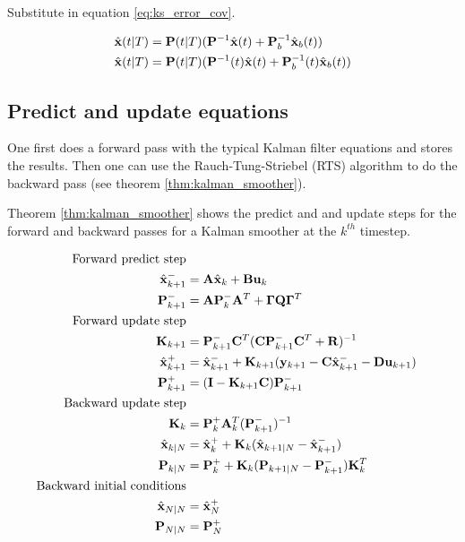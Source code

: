 Substitute in equation \eqref{eq:ks_error_cov}.

\begin{align}
  \hat{\mathbf{x}}(t|T) &= \mathbf{P}(t|T)
    (\mathbf{P}^{-1}\hat{\mathbf{x}}(t) + \mathbf{P}_b^{-1}\hat{\mathbf{x}}_b(t)) \nonumber
    \\
  \hat{\mathbf{x}}(t|T) &= \mathbf{P}(t|T)
    (\mathbf{P}^{-1}(t)\hat{\mathbf{x}}(t) + \mathbf{P}_b^{-1}(t)\hat{\mathbf{x}}_b(t))
\end{align}

\subsection{Predict and update equations}

One first does a forward pass with the typical Kalman filter equations and
stores the results. Then one can use the Rauch-Tung-Striebel (RTS) algorithm to
do the backward pass (see theorem \ref{thm:kalman_smoother}).

Theorem \ref{thm:kalman_smoother} shows the predict and and update steps for the
forward and backward passes for a Kalman smoother at the $k^{th}$ timestep.

\begin{theorem}
  \label{thm:kalman_smoother}

  \begin{align}
    \text{Forward predict step} \nonumber \\
    \hat{\mathbf{x}}_{k+1}^- &= \mathbf{A}\hat{\mathbf{x}}_k + \mathbf{B} \mathbf{u}_k \\
    \mathbf{P}_{k+1}^- &= \mathbf{A} \mathbf{P}_k^- \mathbf{A}^T +
      \mathbf{\Gamma}\mathbf{Q}\mathbf{\Gamma}^T \\
    \text{Forward update step} \nonumber \\
    \mathbf{K}_{k+1} &=
      \mathbf{P}_{k+1}^- \mathbf{C}^T (\mathbf{C}\mathbf{P}_{k+1}^- \mathbf{C}^T +
      \mathbf{R})^{-1} \\
    \hat{\mathbf{x}}_{k+1}^+ &=
      \hat{\mathbf{x}}_{k+1}^- + \mathbf{K}_{k+1}(\mathbf{y}_{k+1} -
      \mathbf{C} \hat{\mathbf{x}}_{k+1}^- - \mathbf{D}\mathbf{u}_{k+1}) \\
    \mathbf{P}_{k+1}^+ &= (\mathbf{I} - \mathbf{K}_{k+1}\mathbf{C})\mathbf{P}_{k+1}^- \\
    \text{Backward update step} \nonumber \\
    \mathbf{K}_k &= \mathbf{P}_k^+ \mathbf{A}_k^T (\mathbf{P}_{k+1}^-)^{-1} \\
    \hat{\mathbf{x}}_{k|N} &= \hat{\mathbf{x}}_k^+ +
      \mathbf{K}_k(\hat{\mathbf{x}}_{k+1|N} - \hat{\mathbf{x}}_{k+1}^-) \\
    \mathbf{P}_{k|N} &=
      \mathbf{P}_k^+ + \mathbf{K}_k(\mathbf{P}_{k+1|N} - \mathbf{P}_{k+1}^-)\mathbf{K}_k^T \\
    \text{Backward initial conditions} \nonumber \\
    \hat{\mathbf{x}}_{N|N} &= \hat{\mathbf{x}}_N^+ \\
    \mathbf{P}_{N|N} &= \mathbf{P}_N^+
  \end{align}
\end{theorem}

